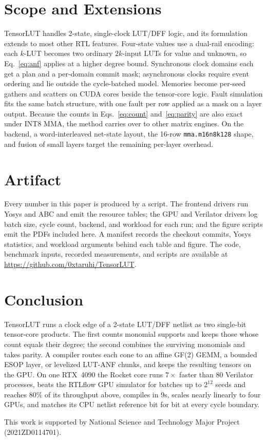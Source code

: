 \documentclass[sigconf]{acmart}
\begin{document}
\section{Scope and Extensions}\label{sec:scope}
TensorLUT handles 2-state, single-clock LUT/DFF logic, and its formulation extends to most other
RTL features. Four-state values use a dual-rail encoding: each $k$-LUT
becomes two ordinary $2k$-input LUTs for value and unknown, so Eq.~\eqref{eq:anf} applies at a higher
degree bound. Synchronous clock domains each get a plan and a per-domain commit mask; asynchronous
clocks require event ordering and lie outside the cycle-batched model. Memories become per-seed
gathers and scatters on CUDA cores beside the tensor-core logic. Fault simulation fits the same
batch structure, with one fault per row applied as a mask on a layer output. Because the counts in
Eqs.~\eqref{eq:count} and~\eqref{eq:parity} are also exact under INT8 MMA, the method carries over to
other matrix engines. On the backend, a word-interleaved net-state layout, the 16-row
\texttt{mma.m16n8k128} shape, and fusion of small layers target the remaining per-layer overhead.

\section{Artifact}
Every number in this paper is produced by a script. The frontend drivers run Yosys and ABC and emit
the resource tables; the GPU and Verilator drivers log batch size, cycle count, backend, and workload
for each run; and the figure scripts emit the PDFs included here. A manifest records the checkout
commits, Yosys statistics, and workload arguments behind each table and figure. The code, benchmark
inputs, recorded measurements, and scripts are available at
\url{https://github.com/0xtaruhi/TensorLUT}.

\section{Conclusion}
TensorLUT runs a clock edge of a 2-state LUT/DFF netlist as two single-bit tensor-core products. The
first counts monomial supports and keeps those whose count equals their degree; the second combines
the surviving monomials and takes parity. A compiler routes each cone to an affine GF(2) GEMM, a
bounded ESOP layer, or levelized LUT-ANF chunks, and keeps the resulting tensors on the GPU. On one
RTX~4090 the Rocket core runs $7\times$ faster than 80 Verilator processes, beats the RTLflow GPU
simulator for batches up to $2^{12}$ seeds and reaches 80\% of its throughput above, compiles in 9s,
scales nearly linearly to four GPUs, and matches its CPU netlist reference bit for bit at every
cycle boundary.

\begin{acks}
This work is supported by National Science and Technology Major Project (2021ZD0114701).
\end{acks}



\end{document}
